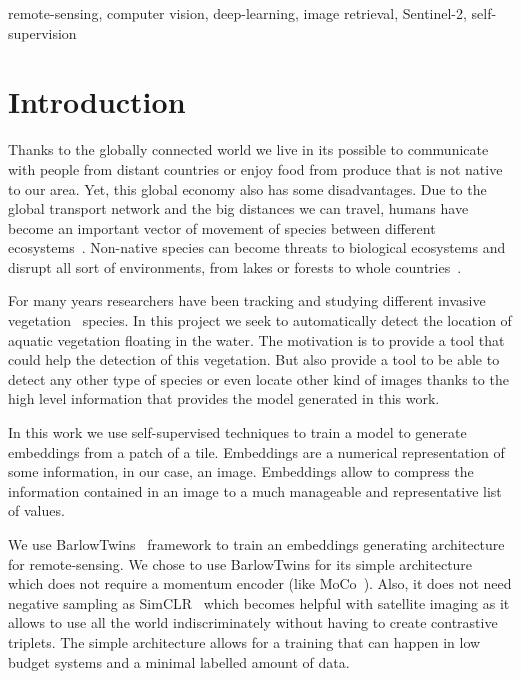 \documentclass[conference]{IEEEtran}
\begin{document}
    \begin{IEEEkeywords}
        remote-sensing, computer vision, deep-learning, image retrieval, Sentinel-2, self-supervision
    \end{IEEEkeywords}


    \section{Introduction}
    Thanks to the globally connected world we live in its possible to communicate with people from distant countries or
    enjoy food from produce that is not native to our area.
    Yet, this global economy also has some disadvantages.
    Due to the global transport network and the big distances we can travel, humans have become an important vector of movement of species
    between different ecosystems~\cite{invasive_species}.
    Non-native species can become threats to biological ecosystems and disrupt all sort of environments,
    from lakes or forests to whole countries~\cite{bhlitem21490}.

    For many years researchers have been tracking and studying different invasive vegetation~\cite{huang2009applications, aguir2013, donyana1, donyana2} species.
    In this project we seek to automatically detect the location of aquatic vegetation floating in the water.
    The motivation is to provide a tool that could help the detection of this vegetation.
    But also provide a tool to be able to detect any other type of species or even locate other kind of images thanks to the
    high level information that provides the model generated in this work.

    In this work we use self-supervised techniques to train a model to generate embeddings from a patch of a tile.
    Embeddings are a numerical representation of some information, in our case, an image.
    Embeddings allow to compress the information contained in an image to a much manageable and representative list of values.

    We use BarlowTwins~\cite{barlowtwins} framework to train an embeddings generating architecture for remote-sensing.
    We chose to use BarlowTwins for its simple architecture which does not require a momentum encoder (like MoCo~\cite{he2020momentum, grill2020bootstrap}).
    Also, it does not need negative sampling as SimCLR~\cite{chen2020simple} which becomes helpful with satellite imaging as it allows to use
    all the world indiscriminately without having to create contrastive triplets.
    The simple architecture allows for a training that can happen in low budget systems and a minimal labelled amount of data.
\end{document}
